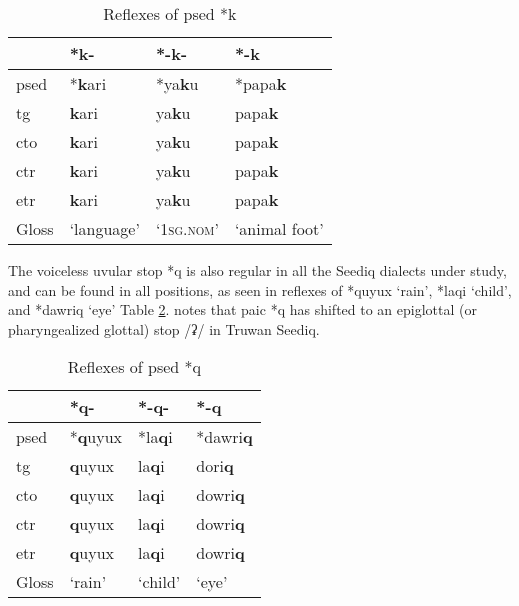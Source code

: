 \begin{table}[!htbp]
\centering
\caption{Reflexes of \acl{psed} *k}
\label{tab:psed_k}
\begin{tabular}{llll}
\hline
           & *k-        & *-k-               & *-k           \\ \hline
\acs{psed} & *\textbf{k}ari      & *ya\textbf{k}u              & *papa\textbf{k}        \\ \hdashline
\acs{tg}   & \textbf{k}ari       & ya\textbf{k}u               & papa\textbf{k}         \\
\acs{cto}  & \textbf{k}ari       & ya\textbf{k}u               & papa\textbf{k}         \\
\acs{ctr}  & \textbf{k}ari       & ya\textbf{k}u               & papa\textbf{k}         \\
\acs{etr}  & \textbf{k}ari       & ya\textbf{k}u               & papa\textbf{k}         \\ \hline
Gloss      & `language' & `\textsc{1sg.nom}' & `animal foot' \\ \hline
\end{tabular}
\end{table}

The voiceless uvular stop *q is also regular in all the Seediq dialects under study, and can be found in all positions, as seen in reflexes of *quyux `rain', *laqi `child', and *dawriq `eye' Table \ref{tab:psed_q}. \textcite{li1981paic} notes that \acl{paic} *q has shifted to an epiglottal (or pharyngealized glottal) stop /ʡ/ in Truwan Seediq. 

\begin{table}[!htbp]
\centering
\caption{Reflexes of \acl{psed} *q}
\label{tab:psed_q}
\begin{tabular}{llll}
\hline
           & *q-    & *-q-    & *-q     \\ \hline
\acs{psed} & *\textbf{q}uyux & *la\textbf{q}i   & *dawri\textbf{q}  \\ \hdashline
\acs{tg}   & \textbf{q}uyux  & la\textbf{q}i    & dori\textbf{q}   \\
\acs{cto}  & \textbf{q}uyux  & la\textbf{q}i    & dowri\textbf{q}   \\
\acs{ctr}  & \textbf{q}uyux  & la\textbf{q}i    & dowri\textbf{q}   \\
\acs{etr}  & \textbf{q}uyux  & la\textbf{q}i    & dowri\textbf{q}   \\ \hline
Gloss      & `rain' & `child' & `eye' \\ \hline
\end{tabular}
\end{table}

